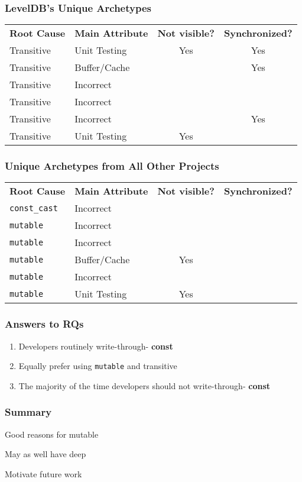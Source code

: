 \documentclass[aspectratio=169]{beamer}
\newcommand{\const}{{\color{blue} \bfseries \ttfamily const}}
\begin{document}
  \begin{frame}
    \frametitle{LevelDB's Unique Archetypes}
    \Large
    \begin{tabular}{p{2.65cm} p{4cm} c c}
      \textbf{Root Cause} & \textbf{Main Attribute}
      & \textbf{Not visible?} & \textbf{Synchronized?} \\

      Transitive & Unit Testing & Yes & Yes \\
      Transitive & Buffer/Cache &   & Yes \\
      Transitive & Incorrect &   &   \\
      Transitive & Incorrect &   &   \\
      Transitive & Incorrect &   & Yes \\
      Transitive & Unit Testing & Yes &   \\
    \end{tabular}
  \end{frame}

  \begin{frame}
    \frametitle{Unique Archetypes from All Other Projects}
    \Large
    \begin{tabular}{p{2.65cm} p{4cm} c c}
      \textbf{Root Cause} & \textbf{Main Attribute}
      & \textbf{Not visible?} & \textbf{Synchronized?} \\

      \texttt{const\_cast} & Incorrect &   &   \\
      \texttt{mutable} & Incorrect &   &   \\
      \texttt{mutable} & Incorrect &   &   \\
      \texttt{mutable} & Buffer/Cache & Yes &   \\
      \texttt{mutable} & Incorrect &   &   \\
      \texttt{mutable} & Unit Testing & Yes &   \\
    \end{tabular}
  \end{frame}

  \begin{frame}
    \frametitle{Answers to RQs}
    \Large
    \begin{enumerate}
      \setlength\itemsep{1em}
      \item Developers routinely write-through-\const{}
      \item Equally prefer using \texttt{mutable} and transitive
      \item The majority of the time developers should not write-through-\const{}
    \end{enumerate}
  \end{frame}

  \begin{frame}
    \frametitle{Summary}

    Good reasons for mutable

    May as well have deep

    Motivate future work
  \end{frame}
\end{document}
